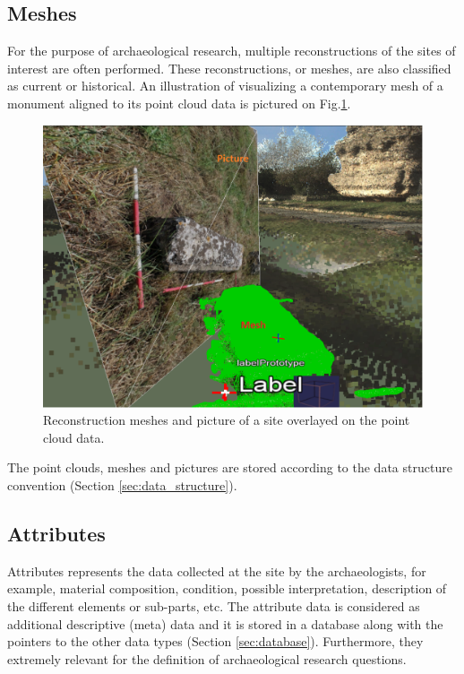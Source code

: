 \subsection{Meshes}
For the purpose of archaeological research, multiple reconstructions of the
sites of interest are often performed. These reconstructions, or meshes, are
also classified as current or historical. An illustration of visualizing a
contemporary mesh of a monument aligned to its point cloud data is pictured
on Fig.\ref{fig:viaAppiaMeshPicture}.

\begin{figure}[!ht] \centering
\includegraphics[scale=0.5]{fig/conceptual_description/ViaAppiaMeshPicture.pdf}
\caption{Reconstruction meshes and picture of a site overlayed on the point
cloud data.} \label{fig:viaAppiaMeshPicture} \end{figure}

The point clouds, meshes and pictures are stored according to the data
structure convention (Section \ref{sec:data_structure}).

\subsection {Attributes}
Attributes represents the data collected at the site by the archaeologists, 
for example, material composition, condition, possible interpretation,
description of the different elements or sub-parts, etc. The attribute data
is considered as additional descriptive (meta) data and it is stored in a
database along with the pointers to the other data types (Section
\ref{sec:database}). Furthermore, they extremely relevant for the definition
of archaeological research questions.
